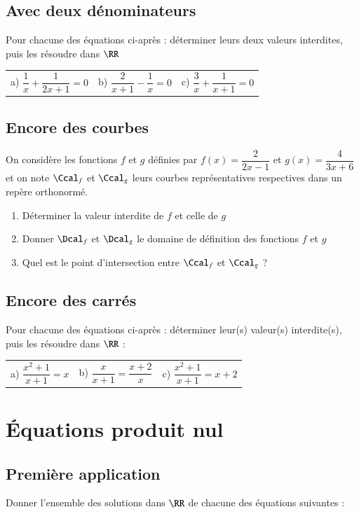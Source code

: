 \documentclass[oneside,12pt]{article}          %
\begin{document}
\subsection{Avec deux dénominateurs}
Pour chacune des équations ci-après : déterminer leurs deux valeurs interdites, puis les résoudre dans $\RR$

\begin{tabular}{p{} p{} p{}}
	a) $\dfrac{1}{x} + \dfrac{1}{2x + 1} = 0$ &
	b) $\dfrac{2}{x+1} - \dfrac{1}{x} = 0$ &
	c) $\dfrac{3}{x} + \dfrac{1}{x + 1} = 0$
\end{tabular}



\subsection{Encore des courbes}
On considère les fonctions $f$ et $g$ définies par $f(x) = \dfrac{2}{2x - 1}$ et $g(x) = \dfrac{4}{3x + 6}$ et on note $\Ccal_f$ et $\Ccal_g$ leurs courbes représentatives respectives dans un repère orthonormé.
\begin{enumerate}
	\item Déterminer la valeur interdite de $f$ et celle de $g$
	\item Donner $\Dcal_f$  et $\Dcal_g$ le domaine de définition des fonctions $f$ et $g$
	\item Quel est le point d'intersection entre $\Ccal_f$ et $\Ccal_g$ ?
\end{enumerate}



\subsection{Encore des carrés}
Pour chacune des équations ci-après : déterminer leur(s) valeur(s) interdite(s), puis les résoudre dans $\RR$ :

\begin{tabular}{p{} p{} p{}}
	a) $\dfrac{x^2 + 1}{x + 1} = x$ &
	b) $\dfrac{x}{x+1} = \dfrac{x + 2}{x}$ &
	c) $\dfrac{x^2 + 1}{x + 1} = x + 2$
\end{tabular}



\section{Équations produit nul}

\subsection{Première application}
Donner l'ensemble des solutions dans $\RR$ de chacune des équations suivantes :
\end{document}
